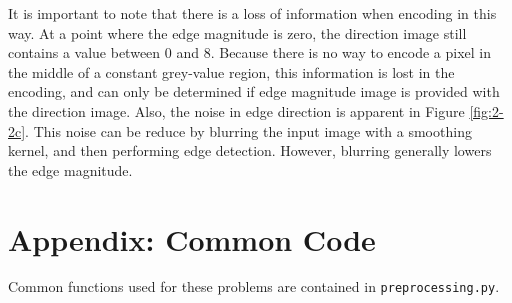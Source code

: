 \documentclass[aps,letterpaper,10pt]{article}
\begin{document}
It is important to note that there is a loss of information when encoding in this way. At a point where the edge magnitude is zero, the direction image still contains a value between 0 and 8.  Because there is no way to encode a pixel in the middle of a constant grey-value region, this information is lost in the encoding, and can only be determined if edge magnitude image is provided with the direction image.
Also, the noise in edge direction is apparent in Figure \ref{fig:2-2c}.  This noise can be reduce by blurring the input image with a smoothing kernel, and then performing edge detection.  However, blurring generally lowers the edge magnitude.



\section{Appendix: Common Code}
Common functions used for these problems are contained in \texttt{preprocessing.py}.

\end{document}
